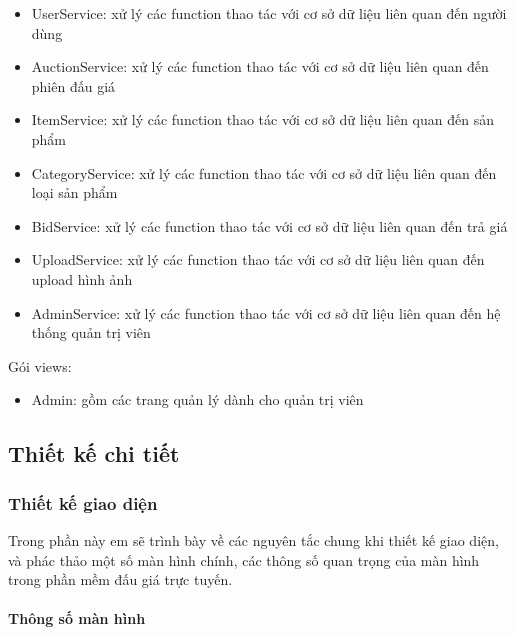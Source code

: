 \documentclass{article}
\begin{document}
\begin{itemize}
    \item UserService: xử lý các function thao tác với cơ sở dữ liệu liên quan đến người dùng
    \item AuctionService: xử lý các function thao tác với cơ sở dữ liệu liên quan đến phiên đấu giá
    \item ItemService: xử lý các function thao tác với cơ sở dữ liệu liên quan đến sản phẩm
    \item CategoryService: xử lý các function thao tác với cơ sở dữ liệu liên quan đến loại sản phẩm
    \item BidService: xử lý các function thao tác với cơ sở dữ liệu liên quan đến trả giá
    \item UploadService: xử lý các function thao tác với cơ sở dữ liệu liên quan đến upload hình ảnh
    \item AdminService: xử lý các function thao tác với cơ sở dữ liệu liên quan đến hệ thống quản trị viên
\end{itemize}
Gói views: 
\begin{itemize}
    \item Admin: gồm các trang quản lý dành cho quản trị viên
\end{itemize}
\subsection{Thiết kế chi tiết}
\subsubsection{Thiết kế giao diện}
Trong phần này em sẽ trình bày về các nguyên tắc chung khi thiết kế giao diện, và phác thảo một số màn hình chính, các thông số quan trọng của màn hình trong phần mềm đấu giá trực tuyến.
\paragraph{Thông số màn hình} \mbox{}
\end{document}
